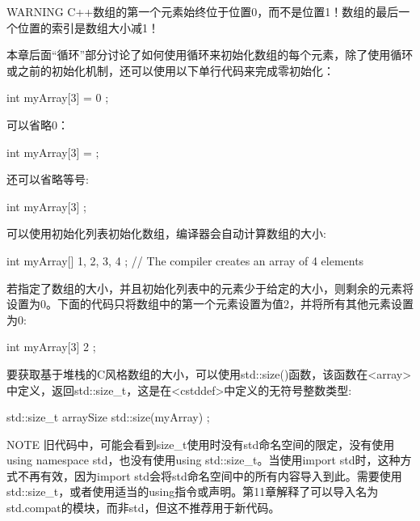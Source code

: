 \begin{myWarning}{WARNING}
C++数组的第一个元素始终位于位置0，而不是位置1！数组的最后一个位置的索引是数组大小减1！
\end{myWarning}

本章后面“循环”部分讨论了如何使用循环来初始化数组的每个元素，除了使用循环或之前的初始化机制，还可以使用以下单行代码来完成零初始化：

\begin{cpp}
int myArray[3] = { 0 };
\end{cpp}

可以省略0：

\begin{cpp}
int myArray[3] = {};
\end{cpp}

还可以省略等号:

\begin{cpp}
int myArray[3] {};
\end{cpp}

可以使用初始化列表初始化数组，编译器会自动计算数组的大小:

\begin{cpp}
int myArray[] { 1, 2, 3, 4 }; // The compiler creates an array of 4 elements
\end{cpp}

若指定了数组的大小，并且初始化列表中的元素少于给定的大小，则剩余的元素将设置为0。下面的代码只将数组中的第一个元素设置为值2，并将所有其他元素设置为0:

\begin{cpp}
int myArray[3] { 2 };
\end{cpp}

要获取基于堆栈的C风格数组的大小，可以使用std::size()函数，该函数在<array>中定义，返回std::size\_t，这是在<cstddef>中定义的无符号整数类型:

\begin{cpp}
std::size_t arraySize { std::size(myArray) };
\end{cpp}

\begin{myNotic}{NOTE}
旧代码中，可能会看到size\_t使用时没有std命名空间的限定，没有使用using namespace std，也没有使用using std::size\_t。当使用import std时，这种方式不再有效，因为import std会将std命名空间中的所有内容导入到此。需要使用std::size\_t，或者使用适当的using指令或声明。第11章解释了可以导入名为std.compat的模块，而非std，但这不推荐用于新代码。
\end{myNotic}



